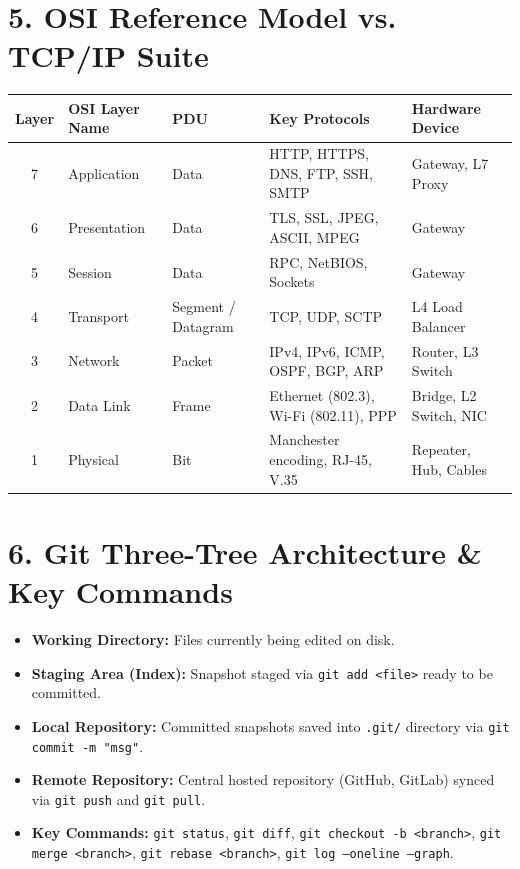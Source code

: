 \section*{5. OSI Reference Model vs. TCP/IP Suite}
\begin{center}
\small
\begin{tabular}{|c|l|l|l|l|}
\hline
\textbf{Layer} & \textbf{OSI Layer Name} & \textbf{PDU} & \textbf{Key Protocols} & \textbf{Hardware Device} \\
\hline
7 & Application & Data & HTTP, HTTPS, DNS, FTP, SSH, SMTP & Gateway, L7 Proxy \\
6 & Presentation & Data & TLS, SSL, JPEG, ASCII, MPEG & Gateway \\
5 & Session & Data & RPC, NetBIOS, Sockets & Gateway \\
4 & Transport & Segment / Datagram & TCP, UDP, SCTP & L4 Load Balancer \\
3 & Network & Packet & IPv4, IPv6, ICMP, OSPF, BGP, ARP & Router, L3 Switch \\
2 & Data Link & Frame & Ethernet (802.3), Wi-Fi (802.11), PPP & Bridge, L2 Switch, NIC \\
1 & Physical & Bit & Manchester encoding, RJ-45, V.35 & Repeater, Hub, Cables \\
\hline
\end{tabular}
\end{center}

\vspace{3mm}

\section*{6. Git Three-Tree Architecture \& Key Commands}
\begin{itemize}[leftmargin=8mm]
    \item \textbf{Working Directory:} Files currently being edited on disk.
    \item \textbf{Staging Area (Index):} Snapshot staged via \texttt{git add <file>} ready to be committed.
    \item \textbf{Local Repository:} Committed snapshots saved into \texttt{.git/} directory via \texttt{git commit -m "msg"}.
    \item \textbf{Remote Repository:} Central hosted repository (GitHub, GitLab) synced via \texttt{git push} and \texttt{git pull}.
    \item \textbf{Key Commands:} \texttt{git status}, \texttt{git diff}, \texttt{git checkout -b <branch>}, \texttt{git merge <branch>}, \texttt{git rebase <branch>}, \texttt{git log --oneline --graph}.
\end{itemize}

\newpage
